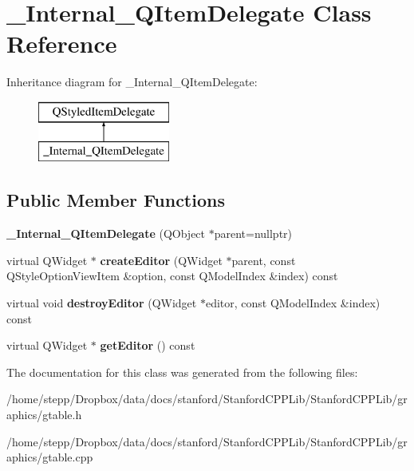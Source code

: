 \hypertarget{class__Internal__QItemDelegate}{}\section{\+\_\+\+Internal\+\_\+\+Q\+Item\+Delegate Class Reference}
\label{class__Internal__QItemDelegate}
Inheritance diagram for \+\_\+\+Internal\+\_\+\+Q\+Item\+Delegate\+:\begin{figure}[H]
\begin{center}
\leavevmode
\includegraphics[height=2.000000cm]{class__Internal__QItemDelegate}
\end{center}
\end{figure}
\subsection*{Public Member Functions}
\begin{DoxyCompactItemize}
\item 
\mbox{\label{class__Internal__QItemDelegate_ac68cfaa4ca75ab10395598e2a0119849}} 
{\bfseries \+\_\+\+Internal\+\_\+\+Q\+Item\+Delegate} (Q\+Object $\ast$parent=nullptr)
\item 
\mbox{\label{class__Internal__QItemDelegate_a437a7709db8554ccae646f29c9f81e8c}} 
virtual Q\+Widget $\ast$ {\bfseries create\+Editor} (Q\+Widget $\ast$parent, const Q\+Style\+Option\+View\+Item \&option, const Q\+Model\+Index \&index) const
\item 
\mbox{\label{class__Internal__QItemDelegate_a8bbeb1e11efd70942261c0089b5a66e5}} 
virtual void {\bfseries destroy\+Editor} (Q\+Widget $\ast$editor, const Q\+Model\+Index \&index) const
\item 
\mbox{\label{class__Internal__QItemDelegate_a5b4e973ff290127001cd6207bb5edb6e}} 
virtual Q\+Widget $\ast$ {\bfseries get\+Editor} () const
\end{DoxyCompactItemize}


The documentation for this class was generated from the following files\+:\begin{DoxyCompactItemize}
\item 
/home/stepp/\+Dropbox/data/docs/stanford/\+Stanford\+C\+P\+P\+Lib/\+Stanford\+C\+P\+P\+Lib/graphics/gtable.\+h\item 
/home/stepp/\+Dropbox/data/docs/stanford/\+Stanford\+C\+P\+P\+Lib/\+Stanford\+C\+P\+P\+Lib/graphics/gtable.\+cpp\end{DoxyCompactItemize}
